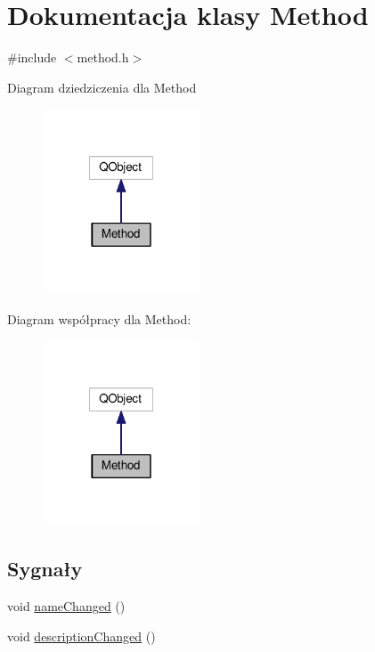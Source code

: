 \hypertarget{class_method}{\section{Dokumentacja klasy Method}
\label{class_method}
}


{\ttfamily \#include $<$method.\-h$>$}



Diagram dziedziczenia dla Method
\nopagebreak
\begin{figure}[H]
\begin{center}
\leavevmode
\includegraphics[width=132pt]{class_method__inherit__graph}
\end{center}
\end{figure}


Diagram współpracy dla Method\-:
\nopagebreak
\begin{figure}[H]
\begin{center}
\leavevmode
\includegraphics[width=132pt]{class_method__coll__graph}
\end{center}
\end{figure}
\subsection*{Sygnały}
\begin{DoxyCompactItemize}
\item 
void \hyperlink{class_method_a91df3e429b16192100609942fed0c4e7}{name\-Changed} ()
\item 
void \hyperlink{class_method_a555273e8a9c3dbf7c5266d1d34224a87}{description\-Changed} ()
\end{DoxyCompactItemize}
